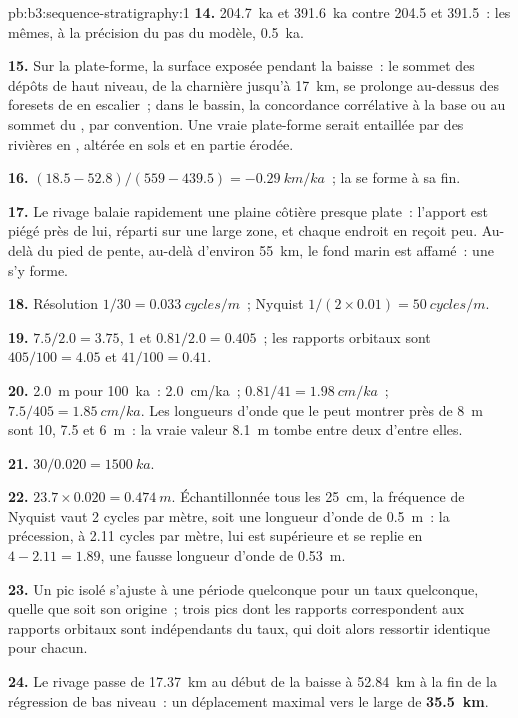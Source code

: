 \begin{solution}{pb:b3:sequence-stratigraphy:1}
\textbf{14.} \qty{204.7}{ka} et \qty{391.6}{ka} contre 204.5 et 391.5~: les mêmes,
à la précision du pas du modèle, \qty{0.5}{ka}.

\textbf{15.} Sur la plate-forme, la surface exposée pendant la baisse~: le sommet des
dépôts de haut niveau, de la charnière jusqu'à \qty{17}{km}, se prolonge au-dessus des
foresets de  en escalier~; dans le bassin, la concordance corrélative
à la base ou au sommet du , par convention. Une vraie plate-forme
serait entaillée par des rivières en , altérée en sols et
en partie érodée.

\textbf{16.} $(18.5 - 52.8)/(559 - 439.5) = \qty{-0.29}{km/ka}$~; la
 se forme à sa fin.

\textbf{17.} Le rivage balaie rapidement une plaine côtière presque plate~:
l'apport est piégé près de lui, réparti sur une large zone, et chaque endroit
en reçoit peu. Au-delà du pied de pente, au-delà d'environ \qty{55}{km}, le fond
marin est affamé~: une  s'y forme.

\textbf{18.} Résolution $1/30 = \qty{0.033}{cycles/m}$~; Nyquist $1/(2\times
0.01) = \qty{50}{cycles/m}$.

\textbf{19.} $7.5/2.0 = 3.75$, 1 et $0.81/2.0 = 0.405$~; les rapports orbitaux
sont $405/100 = 4.05$ et $41/100 = 0.41$.

\textbf{20.} \qty{2.0}{m} pour \qty{100}{ka}~: \qty{2.0}{cm/ka}~; $0.81/41 =
\qty{1.98}{cm/ka}$~; $7.5/405 = \qty{1.85}{cm/ka}$. Les longueurs d'onde que le
 peut montrer près de \qty{8}{m} sont 10, 7.5 et \qty{6}{m}~: la
vraie valeur \qty{8.1}{m} tombe entre deux d'entre elles.

\textbf{21.} $30/0.020 = \qty{1500}{ka}$.

\textbf{22.} $23.7\times0.020 = \qty{0.474}{m}$. Échantillonnée tous les
\qty{25}{cm}, la fréquence de Nyquist vaut 2 cycles par mètre, soit une longueur d'onde de
\qty{0.5}{m}~: la précession, à 2.11 cycles par mètre, lui est supérieure et
se replie en $4 - 2.11 = 1.89$, une fausse longueur d'onde de \qty{0.53}{m}.

\textbf{23.} Un pic isolé s'ajuste à une période quelconque pour un taux quelconque,
quelle que soit son origine~; trois pics dont les rapports correspondent aux rapports
orbitaux sont indépendants du taux, qui doit alors ressortir identique pour chacun.

\textbf{24.} Le rivage passe de \qty{17.37}{km} au début de la baisse à
\qty{52.84}{km} à la fin de la régression de bas niveau~: un déplacement
maximal vers le large de \textbf{\qty[text-series-to-math=true]{35.5}{km}}.
\end{solution}
